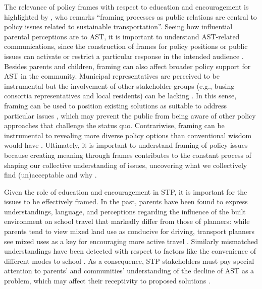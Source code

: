 \documentclass[preprint, 3p,
authoryear]{elsarticle} %
\begin{document}
The relevance of policy frames with respect to education and
encouragement is highlighted by \citet{beland2014developing}, who
remarks ``framing processes as public relations are central to policy
issues related to sustainable transportation''. Seeing how influential
parental perceptions are to AST, it is important to understand
AST-related communications, since the construction of frames for policy
positions or public issues can activate or restrict a particular
response in the intended audience
\citep{panFramingAnalysisApproach1993}. Besides parents and children,
framing can also affect broader policy support for AST in the community.
Municipal representatives are perceived to be instrumental but the
involvement of other stakeholder groups (e.g., busing consortia
representatives and local residents) can be lacking
\citep{buttazzoniSupportingActiveSchool2018}. In this sense, framing can
be used to position existing solutions as suitable to address particular
issues \citep{mahFramecriticalPolicyAnalysis2014}, which may prevent the
public from being aware of other policy approaches that challenge the
status quo. Contrariwise, framing can be instrumental to revealing more
diverse policy options than conventional wisdom would have
\citep{bosomworth2015climate}. Ultimately, it is important to understand
framing of policy issues because creating meaning through frames
contributes to the constant process of shaping our collective
understanding of issues, uncovering what we collectively find
(un)acceptable and why \citep{beland2014developing}.

Given the role of education and encouragement in STP, it is important
for the issues to be effectively framed. In the past, parents have been
found to express understandings, language, and perceptions regarding the
influence of the built environment on school travel that markedly differ
from those of planners: while parents tend to view mixed land use as
conducive for driving, transport planners see mixed uses as a key for
encouraging more active travel \citep{buliungLivingJourneySchool2021}.
Similarly mismatched understandings have been detected with respect to
factors like the convenience of different modes to school
\citep{langUnderstandingModalChoice2011}. As a consequence, STP
stakeholders must pay special attention to parents' and communities'
understanding of the decline of AST as a problem, which may affect their
receptivity to proposed solutions
\citep{buttazzoniSupportingActiveSchool2018}.
\end{document}
